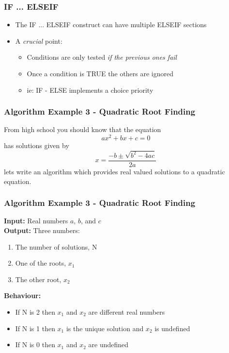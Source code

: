 \documentclass[14pt]{beamer}
\begin{document}
\begin{frame}[fragile]
\frametitle{IF ... ELSEIF}
\begin{itemize}
\item The IF ... ELSEIF construct can have multiple ELSEIF sections
\item A \textit{crucial} point:
	\begin{itemize}
		\item Conditions are only tested \textit{if the previous ones fail}
		\item Once a condition is TRUE the others are ignored
		\item ie: IF - ELSE implements a choice priority
	\end{itemize}
\end{itemize}
\end{frame}


\begin{frame} %
\frametitle{Algorithm Example 3 - Quadratic Root Finding}
From high school you should know that the equation
\begin{equation}
a x^2 + b x + c = 0
\end{equation}
has solutions given by
\begin{equation}
x = \frac{-b \pm \sqrt{b^2 - 4 a c}}{2a}
\end{equation}
lets write an algorithm which provides real valued solutions to a quadratic equation.
\end{frame}

\begin{frame} %
\frametitle{Algorithm Example 3 - Quadratic Root Finding}
{\footnotesize
\textbf{Input:} Real numbers $a$, $b$, and $c$ \\
\textbf{Output:} Three numbers:
\begin{enumerate}
\item The number of solutions, N
\item One of the roots, $x_1$
\item The other root, $x_2$
\end{enumerate}
\textbf{Behaviour:}
\begin{itemize}
\item If N is 2 then $x_1$ and $x_2$ are different real numbers
\item If N is 1 then $x_1$ is the unique solution and $x_2$ is undefined
\item If N is 0 then $x_1$ and $x_2$ are undefined
\end{itemize} 
} 
\end{frame}
\end{document}
